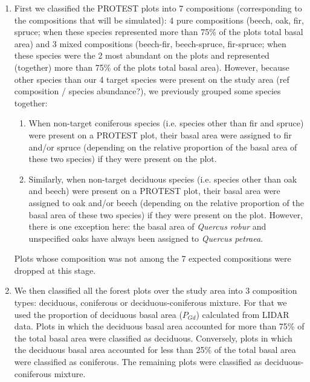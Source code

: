 \documentclass[a4paper]{article}
\begin{document}
\begin{enumerate}

    \item First we classified the PROTEST plots into 7 compositions (corresponding to the compositions that will be simulated): 4 pure compositions (beech, oak, fir, spruce; when these species represented more than 75\% of the plots total basal area) and 3 mixed compositions (beech-fir, beech-spruce, fir-spruce; when these species were the 2 most abundant on the plots and represented (together) more than 75\% of the plots total basal area). However, because other species than our 4 target species were present on the study area (ref composition / species abundance?), we previously grouped some species together:

    \begin{enumerate}

        \item When non-target coniferous species (i.e. species other than fir and spruce) were present on a PROTEST plot, their basal area were assigned to fir and/or spruce (depending on the relative proportion of the basal area of these two species) if they were present on the plot.

        \item Similarly, when non-target deciduous species (i.e. species other than oak and beech) were present on a PROTEST plot, their basal area were assigned to oak and/or beech (depending on the relative proportion of the basal area of these two species) if they were present on the plot. However, there is one exception here: the basal area of \textit{Quercus robur} and unspecified oaks have always been assigned to \textit{Quercus petraea}.

    \end{enumerate}

    Plots whose composition was not among the 7 expected compositions were dropped at this stage.

    \item We then classified all the forest plots over the study area into 3 composition types: deciduous, coniferous or deciduous-coniferous mixture. For that we used the proportion of deciduous basal area ($P_{Gd}$) calculated from LIDAR data. Plots in which the deciduous basal area accounted for more than 75\% of the total basal area were classified as deciduous. Conversely, plots in which the deciduous basal area accounted for less than 25\% of the total basal area were classified as coniferous. The remaining plots were classified as deciduous-coniferous mixture.


\end{enumerate}
\end{document}
